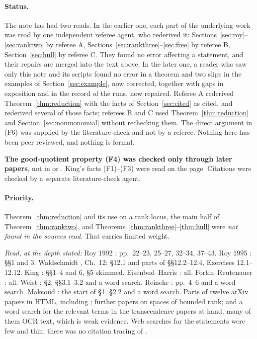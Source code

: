\documentclass[11pt,a4paper]{article}
\theoremstyle{plain}
\theoremstyle{definition}
\begin{document}
\paragraph{Status.} The note has had two reads. In the earlier one, each part of the underlying work was read by one independent referee agent, who rederived it: Sections~\ref{sec:roy}--\ref{sec:ranktwo} by referee A, Sections~\ref{sec:rankthree}--\ref{sec:free} by referee B, Section~\ref{sec:hull} by referee C. They found no error affecting a statement, and their repairs are merged into the text above. In the later one, a reader who saw only this note and its scripts found no error in a theorem and two slips in the examples of Section~\ref{sec:example}, now corrected, together with gaps in exposition and in the record of the runs, now repaired. Referee A rederived Theorem~\ref{thm:reduction} with the facts of Section~\ref{sec:cited} as cited, and rederived several of those facts; referees B and C used Theorem~\ref{thm:reduction} and Section~\ref{sec:nonmonomial} without rechecking them. The direct argument in (F6) was supplied by the literature check and not by a referee. Nothing here has been peer reviewed, and nothing is formal.

\textbf{The good-quotient property (F4) was checked only through later papers}, not in \cite{MFK} or \cite{New}. King's facts (F1)--(F3) were read on the page. Citations were checked by a separate literature-check agent.

\paragraph{Priority.} Theorem~\ref{thm:reduction} and its use on a rank locus, the main half of Theorem~\ref{thm:ranktwo}, and Theorems~\ref{thm:rankthree}--\ref{thm:hull} were \emph{not found in the sources read}. That carries limited weight.

\emph{Read, at the depth stated:} Roy 1992 \cite{Roy92}: pp.~22--23, 25--27, 32--34, 37--43. Roy 1995 \cite{Roy95}: \S\S1 and 3. Waldschmidt \cite{Wal00}, Ch.~12: \S12.1 and parts of \S\S12.2--12.4, Exercises 12.1--12.12. King \cite{Kin94}: \S\S1--4 and 6, \S5 skimmed. Eisenbud--Harris \cite{EH88}: all. Fortin--Reutenauer \cite{FR04}: all. Weist \cite{Wei13}: \S2, \S\S3.1--3.2 and a word search. Reineke \cite{Rei03}: pp.~4--6 and a word search. Maksoud \cite{Mak23}: the start of \S1, \S2.2 and a word search. Parts of twelve arXiv papers in HTML, including \cite{Ar15,Ar23,Rei08}; further papers on spaces of bounded rank; and a word search for the relevant terms in the transcendence papers at hand, many of them OCR text, which is weak evidence. Web searches for the statements were few and thin; there was no citation tracing of \cite{Roy92}.
\end{document}
